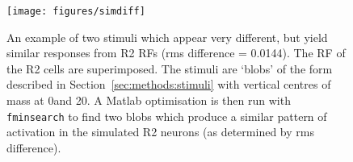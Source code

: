 \begin{figure}
\centering
\texttt{[image: figures/simdiff]}
\caption{An example of two stimuli which appear very different, but yield similar responses from R2 \acp{RF} (\ac{rms} difference = 0.0144). The \ac{RF} of the R2 cells are superimposed. The stimuli are `blobs' of the form described in Section~\ref{sec:methods:stimuli} with vertical centres of mass at 0\degree and 20\degree. A Matlab optimisation is then run with \texttt{fminsearch} to find two blobs which produce a similar pattern of activation in the simulated R2 neurons (as determined by \ac{rms} difference).}

\label{supfig:fcp}
\end{figure}
